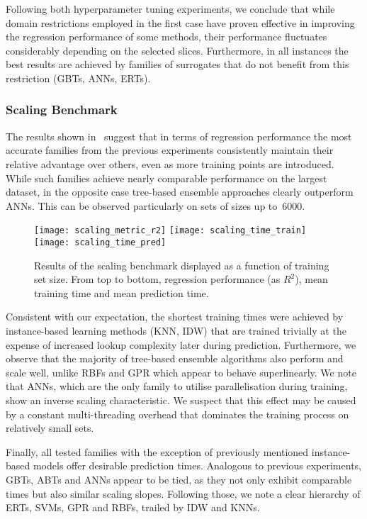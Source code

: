 Following both hyperparameter tuning experiments, we conclude that while domain
restrictions employed in the first case have proven effective in improving the
regression performance of some methods, their performance fluctuates considerably
depending on the selected slices. Furthermore, in all instances the best
results are achieved by families of surrogates that do not benefit from this
restriction (GBTs, ANNs, ERTs).


\subsubsection{Scaling Benchmark}
\label{sec:res-exp3}

The results shown in~ suggest that in terms of regression
performance the most accurate families from the previous experiments
consistently maintain their relative advantage over others, even as
more training points are introduced. While such families achieve nearly comparable
performance on the largest dataset, in the opposite case tree-based ensemble approaches
clearly outperform ANNs. This can be observed
particularly on sets of sizes up to~\num{6000}.

\begin{figure}
	\centering
	\texttt{[image: scaling\_metric\_r2]}
	\texttt{[image: scaling\_time\_train]}
	\texttt{[image: scaling\_time\_pred]}
	\caption{Results of the scaling benchmark displayed as a function of
	training set size. From top to bottom, regression performance (as $R^2$),
	mean training time and mean prediction time.}
	\label{fig:scaling}
\end{figure}

Consistent with our expectation, the shortest training times were achieved by
instance-based learning methods (KNN, IDW) that
are trained trivially at the expense of increased lookup complexity later during prediction.
Furthermore, we observe that the majority of tree-based ensemble algorithms also perform
and scale well, unlike RBFs and GPR which appear to behave superlinearly. We note that ANNs,
which are the only family to utilise parallelisation during training, show an
inverse scaling characteristic. We suspect that this effect may be caused
by a constant multi-threading overhead that dominates the training process
on relatively small sets.

Finally, all tested families with the exception of previously mentioned instance-based
models offer desirable prediction times. Analogous to previous experiments,
GBTs, ABTs and ANNs appear to be tied, as they not only exhibit
comparable times but also similar scaling slopes. Following those, we note a
clear hierarchy of ERTs, SVMs, GPR and RBFs, trailed by IDW and KNNs.


